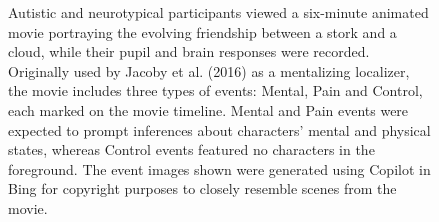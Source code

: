\begin{figure}[!ht]
	\centering
	\caption{Autistic and neurotypical participants viewed a six-minute animated movie portraying the evolving friendship between a stork and a cloud, while their pupil and brain responses were recorded. Originally used by Jacoby et al. (2016) as a mentalizing localizer, the movie includes three types of events: Mental, Pain and Control, each marked on the movie timeline. Mental and Pain events were expected to prompt inferences about characters' mental and physical states, whereas Control events featured no characters in the foreground. The event images shown were generated using Copilot in Bing for copyright purposes to closely resemble scenes from the movie.}
    \vspace*{-10pt}
	\label{fig:task-fig-asc}
\end{figure}


